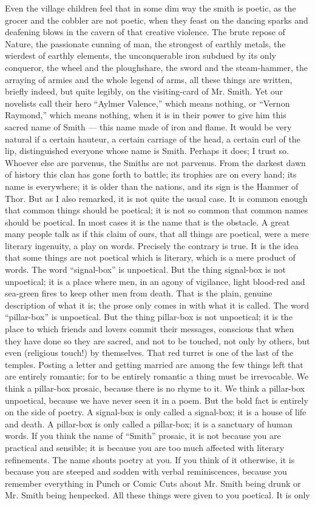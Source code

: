 Even the village children feel that in some dim way the smith is poetic, as the grocer and the cobbler are not poetic, when they feast on the dancing sparks and deafening blows in the cavern of that creative violence. The brute repose of Nature, the passionate cunning of man, the strongest of earthly metals, the wierdest of earthly elements, the unconquerable iron subdued by its only conqueror, the wheel and the ploughshare, the sword and the steam-hammer, the arraying of armies and the whole legend of arms, all these things are written, briefly indeed, but quite legibly, on the visiting-card of Mr. Smith. Yet our novelists call their hero “Aylmer Valence,” which means nothing, or “Vernon Raymond,” which means nothing, when it is in their power to give him this sacred name of Smith — this name made of iron and flame. It would be very natural if a certain hauteur, a certain carriage of the head, a certain curl of the lip, distinguished everyone whose name is Smith. Perhaps it does; I trust so. Whoever else are parvenus, the Smiths are not parvenus. From the darkest dawn of history this clan has gone forth to battle; its trophies are on every hand; its name is everywhere; it is older than the nations, and its sign is the Hammer of Thor. But as I also remarked, it is not quite the usual case. It is common enough that common things should be poetical; it is not so common that common names should be poetical. In most cases it is the name that is the obstacle. A great many people talk as if this claim of ours, that all things are poetical, were a mere literary ingenuity, a play on words. Precisely the contrary is true. It is the idea that some things are not poetical which is literary, which is a mere product of words. The word “signal-box” is unpoetical. But the thing signal-box is not unpoetical; it is a place where men, in an agony of vigilance, light blood-red and sea-green fires to keep other men from death. That is the plain, genuine description of what it is; the prose only comes in with what it is called. The word “pillar-box” is unpoetical. But the thing pillar-box is not unpoetical; it is the place to which friends and lovers commit their messages, conscious that when they have done so they are sacred, and not to be touched, not only by others, but even (religious touch!) by themselves. That red turret is one of the last of the temples. Posting a letter and getting married are among the few things left that are entirely romantic; for to be entirely romantic a thing must be irrevocable. We think a pillar-box prosaic, because there is no rhyme to it. We think a pillar-box unpoetical, because we have never seen it in a poem. But the bold fact is entirely on the side of poetry. A signal-box is only called a signal-box; it is a house of life and death. A pillar-box is only called a pillar-box; it is a sanctuary of human words. If you think the name of “Smith” prosaic, it is not because you are practical and sensible; it is because you are too much affected with literary refinements. The name shouts poetry at you. If you think of it otherwise, it is because you are steeped and sodden with verbal reminiscences, because you remember everything in Punch or Comic Cuts about Mr. Smith being drunk or Mr. Smith being henpecked. All these things were given to you poetical. It is only 